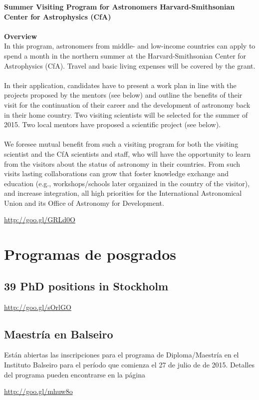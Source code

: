 \documentclass{book}
\begin{document}
 \textbf{Summer Visiting Program for Astronomers Harvard-Smithsonian Center for Astrophysics (CfA)}\\
\\
\textbf{Overview}\\
In this program, astronomers from middle- and low-income countries can apply to spend a month in the northern summer at the Harvard-Smithsonian Center for Astrophysics (CfA). Travel and basic living expenses will be covered by the grant.\\
\\
In their application, candidates have to present a work plan in line with the projects proposed by the mentors (see below) and outline the benefits of their visit for the continuation of their career and the development of astronomy back in their home country. Two visiting scientists will be selected for the summer of 2015. Two local mentors have proposed a scientific project (see below).\\
\\
We foresee mutual benefit from such a visiting program for both the visiting scientist and the CfA scientists and staff, who will have the opportunity to learn from the visitors about the status of astronomy in their countries. From such visits lasting collaborations can grow that foster knowledge exchange and education (e.g., workshops/schools later organized in the country of the visitor), and increase integration, all high priorities for the International Astronomical Union and its Office of Astronomy for Development.
\begin{center}
\url{http://goo.gl/GRLd0O}
\end{center}
       \section*{Programas de posgrados}
\subsection{39 PhD positions in Stockholm }
\begin{center}
\url{http://goo.gl/sOrlGO}
\end{center}
\subsection{Maestría en Balseiro}
Están abiertas las inscripciones para el programa de Diploma/Maestría en el Instituto Balseiro para el período que comienza el 27 de julio de de 2015. Detalles del programa pueden encontrarse en la página
\begin{center}
\url{http://goo.gl/mhuw8o}
\end{center}
\end{document}
